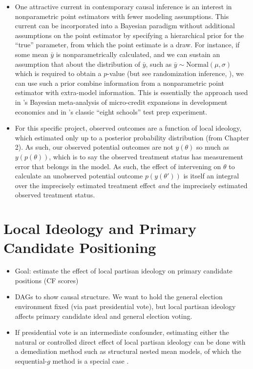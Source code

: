 \documentclass[12pt
              ]{article}
\begin{document}
\begin{itemize}
  \item One attractive current in contemporary causal inference is an interest in nonparametric point estimators with fewer modeling assumptions. This current can be incorporated into a Bayesian paradigm without additional assumptions on the point estimator by specifying a hierarchical prior for the ``true'' parameter, from which the point estimate is a draw. For instance, if some mean $\bar{y}$ is nonparametrically calculated, and we can sustain an assumption that about the distribution of $\bar{y}$, such as $\bar{y} \sim \mathrm{Normal}\left(\mu, \sigma \right)$ which is required to obtain a $p$-value (but see randomization inference, \cite{keele-et-al:2012:RI}), we can use such a prior combine information from a nonparametric point estimator with extra-model information. This is essentially the approach used in \textcite{meager:2019:micro-credit}'s Bayesian meta-analysis of micro-credit expansions in development economics and in \textcite{rubin:1981:eight-schools}'s classic ``eight schools'' test prep experiment.
  \item For this specific project, observed outcomes are a function of local ideology, which estimated only up to a posterior probability distribution (from Chapter 2). As such, our observed potential outcomes are not $y(\theta)$ so much as $y(p(\theta))$, which is to say the observed treatment status has measurement error that belongs in the model. As such, the effect of intervening on $\theta$ to calculate an unobserved potential outcome $p\left(y\left(\theta'\right)\right)$ is itself an integral over the imprecisely estimated treatment effect \emph{and} the imprecisely estimated observed treatment status. 
\end{itemize}


\section{Local Ideology and Primary Candidate Positioning}

\begin{itemize}
  \item Goal: estimate the effect of local partisan ideology on primary candidate positions (CF scores)
  \item DAGs to show causal structure. We want to hold the general election environment fixed (via past presidential vote), but local partisan ideology affects primary candidate ideal and general election voting.
  \item If presidential vote is an intermediate confounder, estimating either the natural or controlled direct effect of local partisan ideology can be done with a demediation method such as structural nested mean models, of which the sequential-$g$ method is a special case \parencite{acharya2016explaining}.
\end{itemize}
\end{document}

